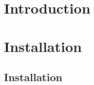 \hypertarget{index_intro_sec}{}\section{Introduction}\label{index_intro_sec}
\hypertarget{index_install_sec}{}\section{Installation}\label{index_install_sec}
\hypertarget{index_install_sec}{}\subsection{Installation}\label{index_install_sec}
